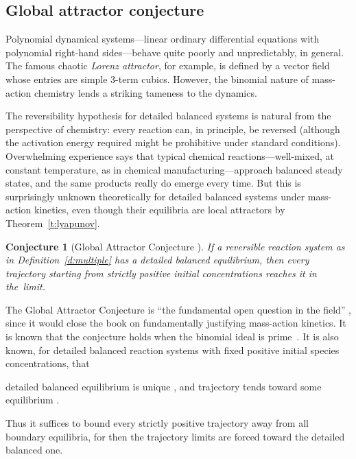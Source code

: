 \documentclass[12pt]{amsart}
\numberwithin{equation}{section}
\newtheorem{conj}[thm]{Conjecture}
\theoremstyle{definition}
\begin{document}
\subsection{Global attractor conjecture}\label{s:gac}
Polynomial dynamical systems---linear ordinary differential equations
with polynomial right-hand sides---behave quite poorly and
unpredictably, in general.  The famous chaotic \emph{Lorenz
attractor}, for example, is defined by a vector field whose entries
are simple $3$-term cubics.  However, the binomial nature of
mass-action chemistry lends a striking tameness to the dynamics.

The reversibility hypothesis for detailed balanced systems is natural
from the perspective of chemistry: every reaction can, in principle,
be reversed (although the activation energy required might be
prohibitive under standard conditions).  Overwhelming experience says
that typical chemical reactions---well-mixed, at constant temperature,
as in chemical manufacturing---approach balanced steady states, and
the same products really do emerge every time.  But this is
surprisingly unknown theoretically for detailed balanced systems under
mass-action kinetics, even though their equilibria are local
attractors by Theorem~\ref{t:lyapunov}.

\begin{conj}[Global Attractor Conjecture \cite{HJ72,horn74}]\label{c:gac}
If a reversible reaction system as in Definition~\ref{d:multiple} has
a detailed balanced equilibrium, then every trajectory starting from
strictly positive initial concentrations reaches it in the~limit.
\end{conj}

The Global Attractor Conjecture is ``the fundamental open question in
the field'' \cite[\S1]{mass-actionReview}, since it would close the
book on fundamentally justifying mass-action kinetics.  It is known
that the conjecture holds when the binomial ideal is
prime~\cite{gopalkr09}.  It is also known, for detailed balanced
reaction systems with fixed positive initial species concentrations,
that
\begin{enumerate}
\itemthe detailed balanced equilibrium is unique \cite{feinberg87}, and
\itemeach trajectory tends toward some equilibrium
\cite{sontag01,chavez03}.
\end{enumerate}
Thus it suffices to bound every strictly positive trajectory away from
all boundary equilibria, for then the trajectory limits are forced
toward the detailed balanced one.
\end{document}
